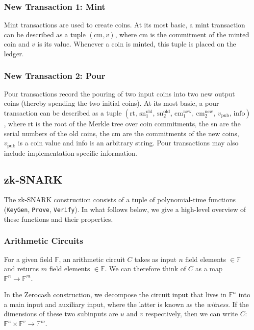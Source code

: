 \documentclass{article}
\begin{document}
\subsubsection{New Transaction 1: Mint}
Mint transactions are used to create coins. At its most basic, a mint transaction can be described as a tuple $(\text{cm}, v)$, where $\text{cm}$ is the commitment of the minted coin and $v$ is its value. Whenever a coin is minted, this tuple is placed on the ledger.

\subsubsection{New Transaction 2: Pour}
Pour transactions record the pouring of two input coins into two new output coins (thereby spending the two initial coins). At its most basic, a pour transaction can be described as a tuple $(\text{rt}, \, {\text{sn}}^{\text{old}}_1, \, {\text{sn}}^{\text{old}}_2, \, {\text{cm}}^{\text{new}}_1, \, {\text{cm}}^{\text{new}}_2, \, v_{\text{pub}}, \, \text{info})$, where rt is the root of the Merkle tree over coin commitments, the sn are the serial numbers of the old coins, the cm are the commitments of the new coins, $v_{\text{pub}}$ is a coin value and info is an arbitrary string. Pour transactions may also include implementation-specific information.

\subsection{zk-SNARK}
The zk-SNARK construction consists of a tuple of polynomial-time functions (\texttt{KeyGen}, \texttt{Prove}, \texttt{Verify}). In what follows below, we give a high-level overview of these functions and their properties.

\subsubsection{Arithmetic Circuits}
For a given field $\mathbb{F}$, an arithmetic circuit $C$ takes as input $n$ field elements $\in \mathbb{F}$ and returns $m$ field elements $\in \mathbb{F}$. We can therefore think of $C$ as a map $\mathbb{F}^n \longrightarrow \mathbb{F}^m$.

In the Zerocash construction, we decompose the circuit input that lives in $\mathbb{F}^n$ into a main input and auxiliary input, where the latter is known as the \emph{witness}. If the dimensions of these two subinputs are $u$ and $v$ respectively, then we can write $C$: $\mathbb{F}^u \times \mathbb{F}^v \longrightarrow \mathbb{F}^m$.
\end{document}
